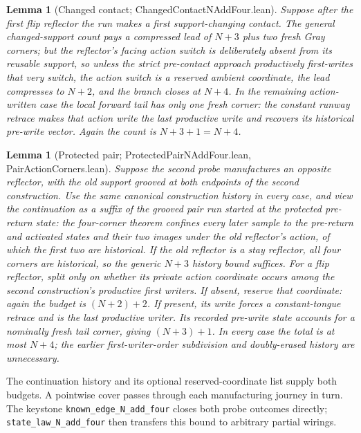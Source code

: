 \documentclass[11pt]{article}
\newtheorem{lemma}[theorem]{Lemma}
\theoremstyle{definition}
\newcommand{\lean}[1]{\texttt{#1}}
\newcommand{\file}[1]{\textsf{#1}}
\begin{document}
\begin{lemma}[Changed contact; \file{ChangedContactNAddFour.lean}]\label{lem:contact}
  Suppose after the first flip reflector the run makes a first
  support-changing contact.  The general changed-support count pays a
  compressed lead of $N+3$ plus two fresh Gray corners; but the
  reflector's facing action switch is deliberately absent from its
  reusable support, so unless the strict pre-contact approach
  productively first-writes that very switch, the action switch is a
  reserved ambient coordinate, the lead compresses to $N+2$, and the
  branch closes at $N+4$.  In the remaining action-written case the local
  forward tail has only one fresh corner: the constant runway retrace
  makes that action write the last productive write and recovers its
  historical pre-write vector. Again the count is $N+3+1 = N+4$.
\end{lemma}

\begin{lemma}[Protected pair; \file{ProtectedPairNAddFour.lean},
  \file{PairActionCorners.lean}]
  \label{lem:pair}
  Suppose the second probe manufactures an opposite reflector, with the
  old support grooved at both endpoints of the second construction.
  Use the same canonical construction history in every case, and view the
  continuation as a suffix of the grooved pair run started at the protected
  pre-return state: the four-corner theorem confines every later sample to
  the pre-return and activated states and their two images under the old
  reflector's action, of which the first two are historical. If the old
  reflector is a stay reflector, all four corners are historical, so the
  generic $N+3$ history bound suffices. For a flip reflector,
  split only on whether its private action coordinate occurs among the
  second construction's productive first writers. If absent, reserve that
  coordinate: again the budget is $(N+2)+2$. If present, its write forces a
  constant-tongue retrace and is the last productive writer. Its recorded
  pre-write state accounts for a nominally fresh tail corner, giving
  $(N+3)+1$. In every case the total is at most $N+4$; the earlier
  first-writer-order subdivision and doubly-erased history are unnecessary.
\end{lemma}

The continuation history and its optional reserved-coordinate list supply
both budgets. A pointwise cover passes through each manufacturing journey
in turn. The keystone \lean{known\_edge\_N\_add\_four} closes both probe
outcomes directly; \lean{state\_law\_N\_add\_four} then transfers this bound
to arbitrary partial wirings.
\end{document}
